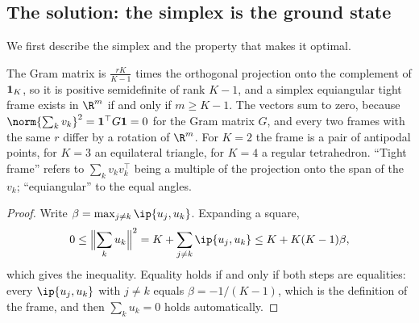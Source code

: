 \begin{refsection}
\section{The solution: the simplex is the ground state}\label{sec:collapse:solution}

We first describe the simplex and the property that makes it optimal.


The Gram matrix is $\frac{rK}{K-1}$ times the orthogonal projection onto the complement of $\mathbf 1_K$, so it is positive semidefinite of rank $K-1$, and a simplex equiangular tight frame exists in $\R^m$ if and only if $m\ge K-1$. The vectors sum to zero, because $\norm{\sum_kv_k}^2=\collapseone^\top G\collapseone=0$ for the Gram matrix $G$, and every two frames with the same $r$ differ by a rotation of $\R^m$. For $K=2$ the frame is a pair of antipodal points, for $K=3$ an equilateral triangle, for $K=4$ a regular tetrahedron. ``Tight frame'' refers to $\sum_kv_kv_k^\top$ being a multiple of the projection onto the span of the $v_k$; ``equiangular'' to the equal angles.


\begin{proof}
Write $\beta=\max_{j\ne k}\ip{u_j,u_k}$. Expanding a square,
\[
  0\le\Bigl\|\sum_ku_k\Bigr\|^2=K+\sum_{j\ne k}\ip{u_j,u_k}\le K+K(K-1)\beta ,
\]
which gives the inequality. Equality holds if and only if both steps are equalities: every $\ip{u_j,u_k}$ with $j\ne k$ equals $\beta=-1/(K-1)$, which is the definition of the frame, and then $\sum_ku_k=0$ holds automatically.
\end{proof}


\end{refsection}
